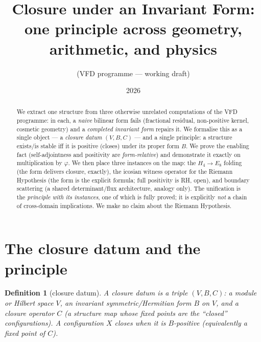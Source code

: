 \documentclass[11pt]{article}
\title{Closure under an Invariant Form:\\ one principle across geometry, arithmetic,
and physics}
\author{(VFD programme --- working draft)}
\date{2026}
\newtheorem{definition}[theorem]{Definition}
\theoremstyle{definition}
\begin{document}
\maketitle

\begin{center}
\end{center}
\medskip

\begin{abstract}
We extract one structure from three otherwise unrelated computations of the VFD programme:
in each, a \emph{naive} bilinear form fails (fractional residual, non-positive kernel,
cosmetic geometry) and a \emph{completed invariant form} repairs it. We formalise this as a
single object --- a \emph{closure datum} $(V,B,C)$ --- and a single principle: a structure
exists/is stable iff it is positive (closes) under its proper form $B$. We prove the
enabling fact (self-adjointness and positivity are \emph{form-relative}) and demonstrate it
exactly on multiplication by $\varphi$. We then place three instances on the map: the
$H_4\to E_8$ folding (the form delivers closure, exactly), the icosian witness operator for
the Riemann Hypothesis (the form is the explicit formula; full positivity is RH, open), and
boundary scattering (a shared determinant/flux architecture, analogy only). The unification
is the \emph{principle with its instances}, one of which is fully proved; it is explicitly
\emph{not} a chain of cross-domain implications. We make no claim about the Riemann
Hypothesis.
\end{abstract}

\section{The closure datum and the principle}\label{sec:datum}
\begin{definition}[closure datum]
A \emph{closure datum} is a triple $(V,B,C)$: a module or Hilbert space $V$, an invariant
symmetric/Hermitian form $B$ on $V$, and a closure operator $C$ (a structure map whose fixed
points are the ``closed'' configurations). A configuration $X$ \emph{closes} when it is
$B$-positive (equivalently a fixed point of $C$).
\end{definition}
\end{document}
